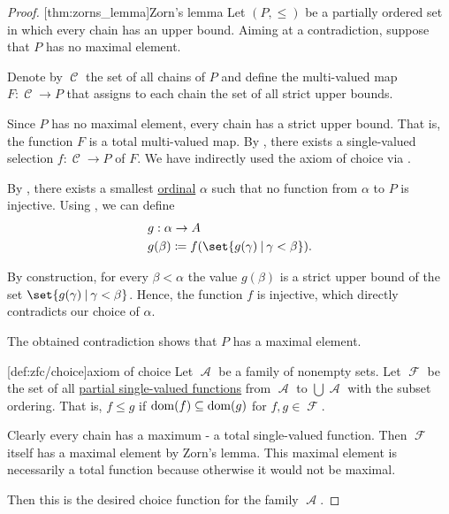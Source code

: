\begin{proof}
  [thm:zorns_lemma]{Zorn's lemma} Let \( (P, \leq) \) be a partially ordered set in which every chain has an upper bound. Aiming at a contradiction, suppose that \( P \) has no maximal element.

  Denote by \( \mscrC \) the set of all chains of \( P \) and define the multi-valued map \( F: \mscrC \to P \) that assigns to each chain the set of all strict upper bounds.

  Since \( P \) has no maximal element, every chain has a strict upper bound. That is, the function \( F \) is a total multi-valued map. By , there exists a single-valued selection \( f: \mscrC \to P \) of \( F \). We have indirectly used the axiom of choice via .

  By , there exists a smallest \hyperref[def:ordinal]{ordinal} \( \alpha \) such that no function from \( \alpha \) to \( P \) is injective. Using , we can define
  \begin{equation*}
    \begin{aligned}
      &g: \alpha \to A \\
      &g(\beta) \coloneqq f(\set{ g(\gamma) \given \gamma < \beta }).
    \end{aligned}
  \end{equation*}

  By construction, for every \( \beta < \alpha \) the value \( g(\beta) \) is a strict upper bound of the set \( \set{ g(\gamma) \given \gamma < \beta } \). Hence, the function \( f \) is injective, which directly contradicts our choice of \( \alpha \).

  The obtained contradiction shows that \( P \) has a maximal element.

  [def:zfc/choice]{axiom of choice} Let \( \mscrA \) be a family of nonempty sets. Let \( \mscrF \) be the set of all \hyperref[def:partial_function]{partial single-valued functions} from \( \mscrA \) to \( \bigcup \mscrA \) with the subset ordering. That is, \( f \leq g \) if \( \operatorname{dom}(f) \subseteq \operatorname{dom}(g) \) for \( f, g \in \mscrF \).

  Clearly every chain has a maximum - a total single-valued function. Then \( \mscrF \) itself has a maximal element by Zorn's lemma. This maximal element is necessarily a total function because otherwise it would not be maximal.

  Then this is the desired choice function for the family \( \mscrA \).
\end{proof}
